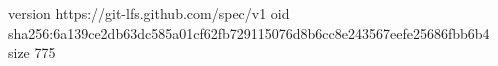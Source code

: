 version https://git-lfs.github.com/spec/v1
oid sha256:6a139ce2db63dc585a01cf62fb729115076d8b6cc8e243567eefe25686fbb6b4
size 775
